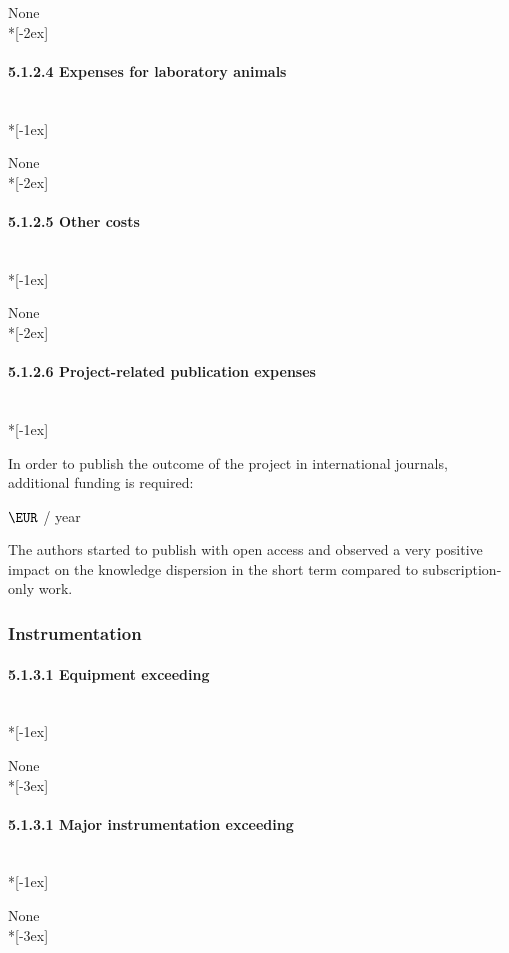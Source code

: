 \documentclass[11pt,a4paper,twoside]{scrartcl}
\begin{document}
\qquad \quad None\\*[-2ex]

\paragraph{5.1.2.4 Expenses for laboratory animals}~\\*[-1ex]

\qquad \quad None\\*[-2ex]

\paragraph{5.1.2.5 Other costs}~\\*[-1ex]

\qquad \quad None\\*[-2ex]

\paragraph{5.1.2.6 Project-related publication expenses}~\\*[-1ex]

In order to publish the outcome of the project in international journals,
additional funding is required: 

  \qquad {} $\EUR$ / year

The authors started to publish with open access and observed a
very positive impact on the knowledge dispersion in the short term 
compared to subscription-only work. 

\subsubsection{Instrumentation}
%
\paragraph{5.1.3.1 Equipment exceeding  }~\\*[-1ex]

\qquad \quad None\\*[-3ex]


\paragraph{5.1.3.1 Major instrumentation exceeding  }~\\*[-1ex]

\qquad \quad None\\*[-3ex]
\end{document}
